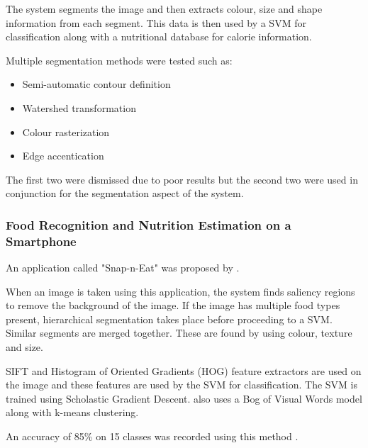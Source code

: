 The system segments the image and then extracts colour, size and shape information from each segment. This data is then used by a SVM for classification along with a nutritional database for calorie information. 

Multiple segmentation methods were tested such as:
\begin{itemize}
	\item{Semi-automatic contour definition}
	\item{Watershed transformation}
	\item{Colour rasterization}
	\item{Edge accentication}
\end{itemize}
The first two were dismissed due to poor results but the second two were used in conjunction for the segmentation aspect of the system.

\subsubsection*{Food Recognition and Nutrition Estimation on a Smartphone}
An application called "Snap-n-Eat" was proposed by \parencite{snap}.

When an image is taken using this application, the system finds saliency regions to remove the background of the image.
If the image has multiple food types present, hierarchical segmentation takes place before proceeding to a SVM. Similar segments are merged together.
These are found by using colour, texture and size.

SIFT and Histogram of Oriented Gradients (HOG) feature extractors are used on the image and these features are used by the SVM for classification.
The SVM is trained using Scholastic Gradient Descent.
\parencite{snap} also uses a Bog of Visual Words model along with k-means clustering.

An accuracy of 85\% on 15 classes was recorded using this method \parencite{snap}.



